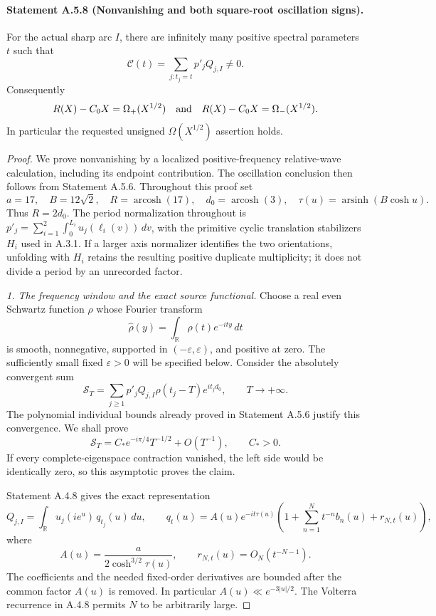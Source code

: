 \paragraph{Statement A.5.8 (Nonvanishing and both square-root oscillation signs).}
For the actual sharp arc $I$, there are infinitely many positive
spectral parameters $t$ such that
\[
 \mathcal C(t)=\sum_{j:t_j=t}p'_jQ_{j,I}\ne0.
\]
Consequently
\[
 R(X)-C_0X=\Omega_+(X^{1/2})
 \quad\hbox{and}\quad
 R(X)-C_0X=\Omega_-(X^{1/2}).
\]
In particular the requested unsigned $\Omega(X^{1/2})$ assertion holds.

\begin{proof}
We prove nonvanishing by a localized positive-frequency relative-wave
calculation, including its endpoint contribution. The oscillation
conclusion then follows from Statement A.5.6.
Throughout this proof set
\[
 a=17,\quad B=12\sqrt2,\quad R=\operatorname{arcosh}(17),
 \quad d_0=\operatorname{arcosh}(3),\quad
 \tau(u)=\operatorname{arsinh}(B\cosh u).
\]
Thus $R=2d_0$.
The period normalization throughout is
$p'_j=\sum_{i=1}^2\int_0^{L_i}u_j(\ell_i(v))\,dv$,
with the primitive cyclic translation stabilizers $H_i$ used in
A.3.1. If a larger axis normalizer identifies the two orientations,
unfolding with $H_i$ retains the resulting positive duplicate
multiplicity; it does not divide a period by an unrecorded factor.

\emph{1. The frequency window and the exact source functional.}
Choose a real even Schwartz function $\rho$ whose Fourier transform
\[
 \widehat\rho(y)=\int_{\mathbb R}\rho(t)e^{-ity}\,dt
\]
is smooth, nonnegative, supported in $(-\varepsilon,\varepsilon)$,
and positive at zero. The sufficiently small fixed $\varepsilon>0$
will be specified below.
Consider the absolutely convergent sum
\begin{equation}\label{A:nonvanishing-window}
 \mathscr S_T=
 \sum_{j\geq1}p'_jQ_{j,I}\rho(t_j-T)e^{it_jd_0},
 \qquad T\to+\infty.
\end{equation}
The polynomial individual bounds already proved in Statement A.5.6
justify this convergence. We shall prove
\begin{equation}\label{A:nonvanishing-wave-asymptotic}
 \mathscr S_T=C_*e^{-i\pi/4}T^{-1/2}+O(T^{-1}),
 \qquad C_*>0.
\end{equation}
If every complete-eigenspace contraction vanished, the left side
would be identically zero, so this asymptotic proves the claim.

Statement A.4.8 gives the exact representation
\[
 Q_{j,I}=\int_{\mathbb R}u_j(i e^u)\,q_{t_j}(u)\,du,
 \qquad
 q_t(u)=
 A(u)e^{-it\tau(u)}
   \left(1+\sum_{n=1}^{N}t^{-n}b_n(u)+r_{N,t}(u)\right),
\]
where
\[
 A(u)=\frac{a}{2\cosh^{3/2}\tau(u)},\qquad
 r_{N,t}(u)=O_N(t^{-N-1}).
\]
The coefficients and the needed fixed-order derivatives are bounded
after the common factor $A(u)$ is removed.
In particular $A(u)\ll e^{-3|u|/2}$.
The Volterra recurrence in A.4.8 permits $N$ to be arbitrarily large.


\end{proof}
